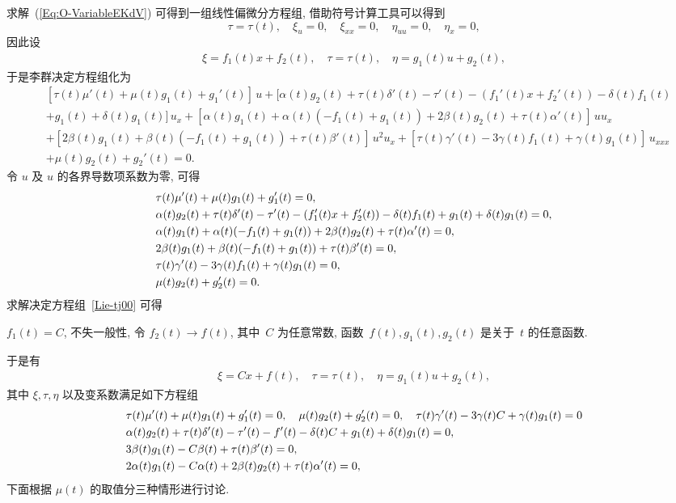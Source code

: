 求解~(\ref{Eq:O-VariableEKdV}) 可得到一组线性偏微分方程组, 借助符号计算工具可以得到
$$\tau=\tau(t),\quad \xi_u=0,\quad \xi_{xx}=0,\quad \eta_{uu}=0,\quad \eta_x=0,$$
因此设
\begin{align}
\xi=f_1(t) x+f_2(t),\quad \tau=\tau(t),\quad \eta=g_1(t)u+g_2(t),
\end{align}
于是李群决定方程组化为
\begin{equation}
\begin{aligned}
  &[\tau(t)\mu'(t)+\mu(t)g_1(t)+g_1'(t)]\,u
  +[\alpha(t)g_2(t)+\tau(t)\delta'(t)
  -\tau'(t)-(f_1'(t)x+f_2'(t))-\delta(t)f_1(t)\\
  &+g_1(t)+\delta(t)g_1(t)]\,u_x
  +[\alpha(t)g_1(t)+\alpha(t)(-f_1(t)+g_1(t))+2\beta(t)g_2(t)+\tau(t)\alpha'(t)]\,uu_x\\
  &+[2\beta(t)g_1(t)+\beta(t)(-f_1(t)+g_1(t))+\tau(t)\beta'(t)]\,u^2u_x
  +[\tau(t)\gamma'(t)-3\gamma(t)f_1(t)+\gamma(t)g_1(t)]\,u_{xxx}\\
  &+\mu(t)g_2(t)+g_2'(t)=0.
\end{aligned}
\end{equation}
令 $u$ 及 $u$ 的各界导数项系数为零, 可得
\begin{align}\label{Lie-tj00}
  &\tau(t)\mu'(t)+\mu(t)g_1(t)+g_1'(t)=0,\notag\\%
  &\alpha(t)g_2(t)+\tau(t)\delta'(t)-\tau'(t)-(f_1'(t)x+f_2'(t))-\delta(t)f_1(t)+g_1(t)+\delta(t)g_1(t)=0,\notag\\%
  &\alpha(t)g_1(t)+\alpha(t)(-f_1(t)+g_1(t))+2\beta(t)g_2(t)+\tau(t)\alpha'(t)=0,\notag\\%
  &2\beta(t)g_1(t)+\beta(t)(-f_1(t)+g_1(t))+\tau(t)\beta'(t)=0,\notag\\%
  &\tau(t)\gamma'(t)-3\gamma(t)f_1(t)+\gamma(t)g_1(t)=0,\notag\\%
  &\mu(t)g_2(t)+g_2'(t)=0.%
\end{align}
求解决定方程组~\eqref{Lie-tj00} 可得

$f_1(t)=C$, 不失一般性, 令 $f_2(t)\rightarrow f(t)$,
其中~$C$ 为任意常数, 函数~$f(t), g_1(t), g_2(t)$ 是关于~$t$ 的任意函数.

于是有
\begin{align}
\xi=C x+f(t),\quad \tau=\tau(t),\quad \eta=g_1(t)u+g_2(t),
\end{align}
其中 $\xi, \tau, \eta$ 以及变系数满足如下方程组
\begin{align}\label{Lie-tj}%
  &\tau(t)\mu'(t)+\mu(t)g_1(t)+g_1'(t)=0,\quad \mu(t)g_2(t)+g_2'(t)=0, \quad\tau(t)\gamma'(t)-3\gamma(t)C+\gamma(t)g_1(t)=0\notag\\
  &\alpha(t)g_2(t)+\tau(t)\delta'(t)-\tau'(t)-f'(t)-\delta(t)C+g_1(t)+\delta(t)g_1(t)=0,\notag\\ &3\beta(t)g_1(t)-C\beta(t)+\tau(t)\beta'(t)=0,\notag\\
  &2\alpha(t)g_1(t)-C \alpha(t)+2\beta(t)g_2(t)+\tau(t)\alpha'(t)=0, %
\end{align}
下面根据 $\mu(t)$ 的取值分三种情形进行讨论.

